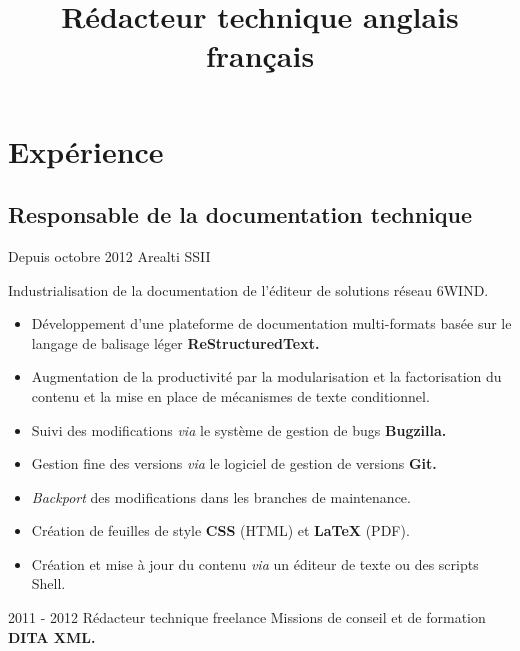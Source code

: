 \documentclass[12pt,a4paper,roman]{moderncv}
\title
    {Rédacteur technique anglais français}
\begin{document}
\makecvtitle %


\section{Expérience}

\subsection{Responsable de la documentation technique}

\cventry
    {Depuis octobre 2012}
    {Arealti}
    {SSII}
    {}
    {}
    {Industrialisation de la documentation de l'éditeur de solutions réseau
      6WIND.
      \begin{itemize}
      \item Développement d'une plateforme de documentation multi-formats
        basée sur le langage de balisage léger \textbf{ReStructuredText.}
      \item Augmentation de la productivité par la modularisation et la
        factorisation du contenu et la mise en place de mécanismes de texte
        conditionnel.
      \item Suivi des modifications \textit{via} le système de gestion de
        bugs \textbf{Bugzilla.}
      \item Gestion fine des versions \textit{via} le logiciel de gestion de
        versions \textbf{Git.}
      \item \textit{Backport} des modifications dans les branches de
        maintenance.
      \item Création de feuilles de style \textbf{CSS} (HTML) et
        \textbf{\LaTeX} (PDF).
      \item Création et mise à jour du contenu \textit{via} un éditeur de texte
        ou des scripts Shell.
      \end{itemize}
    }


\cventry
    {2011 - 2012}
    {Rédacteur technique freelance}
    {\textsc{}}
    {}
    {}
    {Missions de conseil et de formation \textbf{DITA XML.}}

\end{document}
